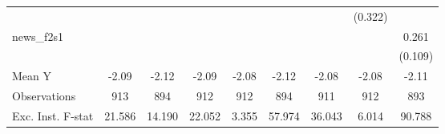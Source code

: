 {\begin{tabular}{l*{8}{c}}
            &                     &                     &                     &                     &                     &                     &     (0.322)         &                     \\
\addlinespace
news\_f2s1   &                     &                     &                     &                     &                     &                     &                     &       0.261\sym{**} \\
            &                     &                     &                     &                     &                     &                     &                     &     (0.109)         \\
\midrule
Mean Y      &       -2.09         &       -2.12         &       -2.09         &       -2.08         &       -2.12         &       -2.08         &       -2.08         &       -2.11         \\
Observations&         913         &         894         &         912         &         912         &         894         &         911         &         912         &         893         \\
Exc. Inst. F-stat&      21.586         &      14.190         &      22.052         &       3.355         &      57.974         &      36.043         &       6.014         &      90.788         \\
\bottomrule
\end{tabular}
}
